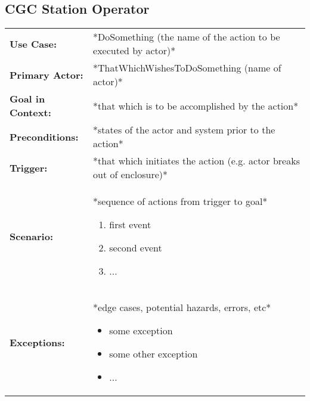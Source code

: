 \documentclass[12pt]{article}
\begin{document}
    \subsection{CGC Station Operator}
    \begin{table}[H]
    \begin{tabular}{lp{9.9cm}}
        \hline
        \textbf{Use Case:}                     & *DoSomething (the name of the action to be executed by actor)* \\

        \textbf{Primary Actor:}                & *ThatWhichWishesToDoSomething (name of actor)*\\

        \textbf{Goal in Context:}              & *that which is to be accomplished by the action* \\

        \textbf{Preconditions:}                & *states of the actor and system prior to the action* \\

        \textbf{Trigger:}                      & *that which initiates the action (e.g. actor breaks out of enclosure)*\\

        \textbf{Scenario:}                     & *sequence of actions from trigger to goal*
                                                 \begin{enumerate}
                                                     \item first event
                                                     \item second event
                                                     \item ...
                                                 \end{enumerate} \\

        \textbf{Exceptions:}                   & *edge cases, potential hazards, errors, etc*
                                                 \begin{itemize}
                                                     \item[] some exception
                                                     \item[] some other exception
                                                     \item[] ...
                                                 \end{itemize}\\


\end{tabular}
\end{table}
\end{document}
